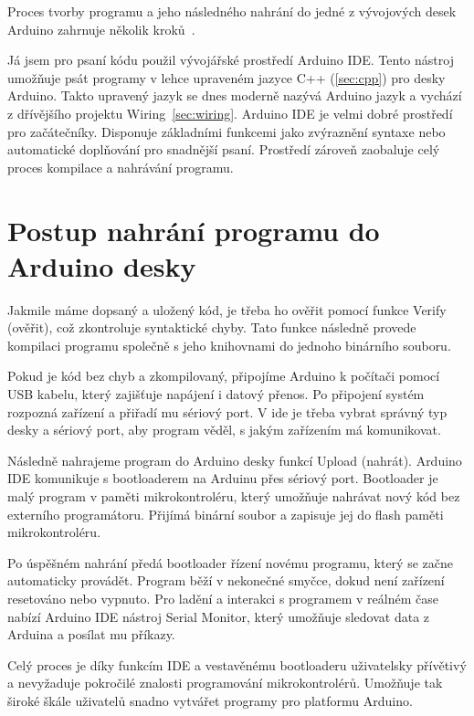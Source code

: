 Proces tvorby programu a jeho následného nahrání do jedné z vývojových desek Arduino zahrnuje několik kroků~\cite{DratekNahravaniProgramu}.

Já jsem pro psaní kódu použil vývojářské prostředí Arduino IDE.
Tento nástroj umožňuje psát programy v lehce upraveném jazyce C++ (\ref{sec:cpp}) pro desky Arduino.
Takto upravený jazyk se dnes moderně nazývá Arduino jazyk a vychází z dřívějšího projektu Wiring~\ref{sec:wiring}.
Arduino IDE je velmi dobré prostředí pro začátečníky.
Disponuje základními funkcemi jako zvýraznění syntaxe nebo automatické doplňování pro snadnější psaní.
Prostředí zároveň zaobaluje celý proces kompilace a nahrávání programu.

\section*{Postup nahrání programu do Arduino desky}
Jakmile máme dopsaný a uložený kód, je třeba ho ověřit pomocí funkce Verify (ověřit), což zkontroluje syntaktické chyby.
Tato funkce následně provede kompilaci programu společně s jeho knihovnami do jednoho binárního souboru.

Pokud je kód bez chyb a zkompilovaný, připojíme Arduino k počítači pomocí USB kabelu, který zajišťuje napájení i datový přenos.
Po připojení systém rozpozná zařízení a přiřadí mu sériový port.
V \gls{ide} je třeba vybrat správný typ desky a sériový port, aby program věděl, s jakým zařízením má komunikovat.

Následně nahrajeme program do Arduino desky funkcí Upload (nahrát).
Arduino IDE komunikuje s bootloaderem na Arduinu přes sériový port.
Bootloader je malý program v paměti mikrokontroléru, který umožňuje nahrávat nový kód bez externího programátoru.
Přijímá binární soubor a zapisuje jej do flash paměti mikrokontroléru.

Po úspěšném nahrání předá bootloader řízení novému programu, který se začne automaticky provádět.
Program běží v nekonečné smyčce, dokud není zařízení resetováno nebo vypnuto.
Pro ladění a interakci s programem v reálném čase nabízí Arduino IDE nástroj Serial Monitor, který umožňuje sledovat data z Arduina a posílat mu příkazy.

Celý proces je díky funkcím IDE a vestavěnému bootloaderu uživatelsky přívětivý a nevyžaduje pokročilé znalosti programování mikrokontrolérů.
Umožňuje tak široké škále uživatelů snadno vytvářet programy pro platformu Arduino.



